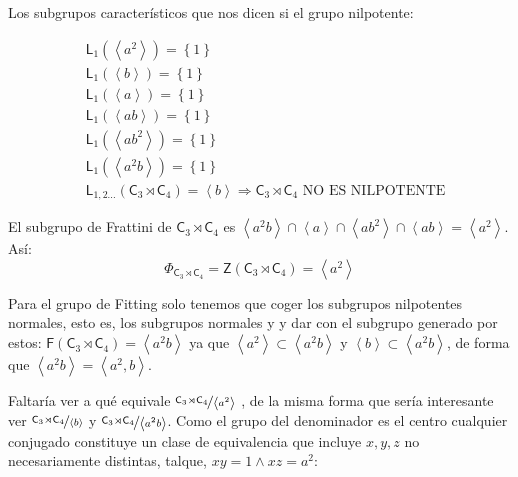\documentclass[12pt,a4paper,fleqn,spanish,final,openright]{extbook}
\theoremstyle{definition}
\theoremstyle{remark}
\begin{document}
Los subgrupos característicos que nos dicen si el grupo nilpotente:

\begin{align*}
&\mathsf{L}_{1}\left({\left\langle{a^2}\right\rangle}\right)
=
{\left\lbrace{1}\right\rbrace}\\
&\mathsf{L}_{1}\left({\left\langle{b}\right\rangle}\right)
=
{\left\lbrace{1}\right\rbrace}\\
&\mathsf{L}_{1}\left({\left\langle{a}\right\rangle}\right)
=
{\left\lbrace{1}\right\rbrace}\\
&\mathsf{L}_{1}\left({\left\langle{ab}\right\rangle}\right)
=
{\left\lbrace{1}\right\rbrace}\\
&\mathsf{L}_{1}\left({\left\langle{ab^2}\right\rangle}\right)
=
{\left\lbrace{1}\right\rbrace}\\
&\mathsf{L}_{1}\left({\left\langle{a^2b}\right\rangle}\right)
=
{\left\lbrace{1}\right\rbrace}\\
&{\mathsf{L}}_{1,2 ...}
\left(
{{{\mathsf{C}}_{3}}\rtimes{{\mathsf{C}}_{4}}}
\right)
=
{\left\langle{b}\right\rangle}    \Rightarrow
{{{\mathsf{C}}_{3}}\rtimes{{\mathsf{C}}_{4}}}
\mbox{ NO ES NILPOTENTE}
\end{align*}

El subgrupo de Frattini de ${{\mathsf{C}}_{3}}\rtimes{{\mathsf{C}}_{4}}$ es
$
\left\langle{ a^2 b}\right\rangle
 ∩
\left\langle{a}\right\rangle
 ∩
\left\langle{a b^2}\right\rangle
\cap
\left\langle{a b}\right\rangle
=
{
\left\langle
{a^2}
\right\rangle
}$.
Así:
\[
{\Phi }_{{{{\mathsf{C}}_{3}}\rtimes{{\mathsf{C}}_{4}}}} =
{\mathsf{Z}}{\left({{{\mathsf{C}}_{3}}\rtimes{{\mathsf{C}}_{4}}}\right)}=
{\left\langle{a^2}\right\rangle}
\]

Para el grupo de Fitting solo tenemos que coger los subgrupos nilpotentes normales, esto es,
los subgrupos normales y y dar con el subgrupo generado por estos: ${\mathsf{F}}
{\left({{{\mathsf{C}}_{3}}\rtimes{{\mathsf{C}}_{4}}}\right)}=
{\left\langle{a^2 b}\right\rangle}$ ya que
${\left\langle{a^2}\right\rangle}   \subset {\left\langle{a^2 b}\right\rangle}$
y ${\left\langle{b}\right\rangle}   \subset {\left\langle{a^2 b}\right\rangle}$,
de forma que ${\left\langle{a^2 b}\right\rangle}={\left\langle{a^2 , b}\right\rangle}$.


Faltaría ver a qué equivale
$\nicefrac{{{{\mathsf{C}}_{3}}\rtimes{{\mathsf{C}}_{4}}}}{\left\langle{a^2}\right\rangle}$
, de la misma forma que sería interesante ver
$\nicefrac{{{{\mathsf{C}}_{3}}\rtimes{{\mathsf{C}}_{4}}}}{\left\langle{b}\right\rangle}$
y $\nicefrac{{{{\mathsf{C}}_{3}}\rtimes{{\mathsf{C}}_{4}}}}{\left\langle{a^2 b}\right\rangle}$.
Como el grupo del denominador es el centro cualquier conjugado constituye un clase de
equivalencia que incluye $x,y,z$ no necesariamente distintas, talque, $xy=1    \wedge    xz=a^2$:
\end{document}
